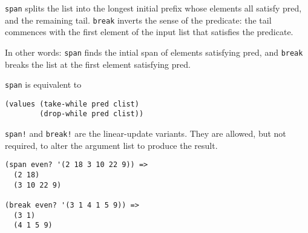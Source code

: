 \begin{entry}{%
  }

  \texttt{span} splits the list into the longest initial prefix whose
  elements all satisfy pred, and the remaining tail. \texttt{break}
  inverts the sense of the predicate: the tail commences with the
  first element of the input list that satisfies the predicate.

  In other words: \texttt{span} finds the intial span of elements
  satisfying pred, and \texttt{break} breaks the list at the first
  element satisfying pred.

  \texttt{span} is equivalent to

\begin{verbatim}
(values (take-while pred clist) 
        (drop-while pred clist))
\end{verbatim}

  \texttt{span!} and \texttt{break!} are the linear-update
  variants. They are allowed, but not required, to alter the argument
  list to produce the result.

\begin{verbatim}
(span even? '(2 18 3 10 22 9)) =>
  (2 18)
  (3 10 22 9)

(break even? '(3 1 4 1 5 9)) =>
  (3 1)
  (4 1 5 9)
\end{verbatim}
\end{entry}

